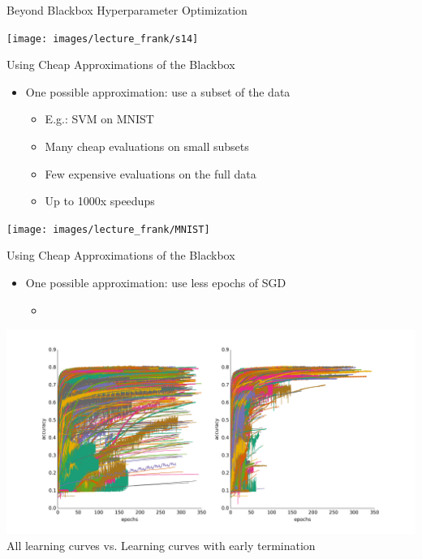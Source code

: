 \begin{frame}[c]{Beyond Blackbox Hyperparameter Optimization}

{\centering
	\texttt{[image: images/lecture\_frank/s14]}
}
\end{frame}
\begin{frame}[c]{Using Cheap Approximations of the Blackbox}
\begin{itemize}
	\item \alert{One possible approximation: use a subset of the data}
	\begin{itemize}
		\item E.g.: SVM on MNIST
		\item Many cheap evaluations on small subsets
		\item Few expensive evaluations on the full data
		\item \alert{Up to 1000x speedups} 
	\end{itemize}
\end{itemize}
{\centering
	\texttt{[image: images/lecture\_frank/MNIST]}
}
\end{frame}
\begin{frame}[c]{Using Cheap Approximations of the Blackbox}
\begin{itemize}
	\item \alert{One possible approximation: use less epochs of SGD}
	\begin{itemize}
		\item {}
	\end{itemize}
\end{itemize}
{\centering
	\includegraphics[width=\textwidth]{images/learning_curve_tuning}
	All learning curves vs. Learning curves with early termination
}
\end{frame}
